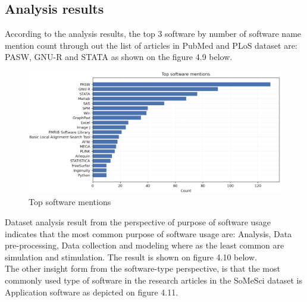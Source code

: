 \subsection{Analysis results }
\label{subsec:dataset:Analysis:results}

According to the analysis results, the top 3 software by number of software name mention count through out the list of articles in PubMed and PLoS dataset are: PASW, GNU-R and STATA as shown on the figure 4.9 below. 

\begin{figure}[htbp]
	\centering
	\includegraphics[width=.90\textwidth]{4.graphics/figures/ch_4/analysisresults/1.Top software mentions}
	\caption{Top software mentions}
	\label{fig:chapter03:setup}
\end{figure}

Dataset analysis result from the perspective of purpose of software usage indicates that the most common purpose of software usage are: Analysis, Data pre-processing, Data collection and modeling where as the least common are simulation and stimulation. The result is shown on figure 4.10 below. \\

The other insight form from  the software-type perspective, is that the most commonly used type of software in the research articles in the SoMeSci dataset is Application software as depicted on figure 4.11. \\

